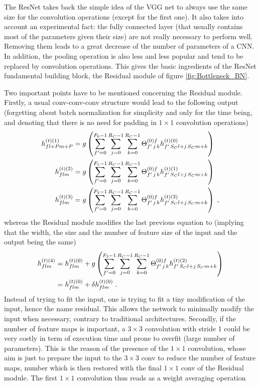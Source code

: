The ResNet\cite{He2015} takes back the simple idea of the VGG net to always use the same size for the convolution operations (except for the first one). It also takes into account an experimental fact: the fully connected layer (that usually contains most of the parameters given their size) are not really necessary to perform well. Removing them leads to a great decrease of the number of parameters of a CNN. In addition, the pooling operation is also less and less popular and tend to be replaced by convolution operations. This gives the basic ingredients of the ResNet fundamental building block, the Residual module of figure \ref{fig:Bottleneck_BN}.

\vspace{0.2cm}

Two important points have to be mentioned concerning the Residual module. Firstly, a usual conv-conv-conv structure would lead to the following output (forgetting about batch normalization for simplicity and only for the time being, and denoting that there is no need for padding in $1\times 1$ convolution operations)
\begin{align}
h^{(t)(1)}_{fl+Pm+P}&=
%
g\left(\sum^{F_0-1}_{f'=0}\sum^{R_C-1}_{j=0}\sum^{R_C-1}_{k=0}
%
\Theta^{(0)f}_{f'\,j\,k}h^{(t)(0)}_{f'\,S_Cl+j\,S_Cm+k}\right)\notag\\
%
h^{(t)(2)}_{flm}&=
%
g\left(\sum^{F_1-1}_{f'=0}\sum^{R_C-1}_{j=0}\sum^{R_C-1}_{k=0}
%
\Theta^{(0)f}_{f'\,j\,k}h^{(t)(1)}_{f'\,S_Cl+j\,S_Cm+k}\right)\notag\\
%
h^{(t)(3)}_{flm}&=
%
g\left(\sum^{F_2-1}_{f'=0}\sum^{R_C-1}_{j=0}\sum^{R_C-1}_{k=0}
%
\Theta^{(0)f}_{f'\,j\,k}h^{(t)(2)}_{f'\,S_Cl+j\,S_Cm+k}\right)\;,
\end{align}
whereas the Residual module modifies the last previous equation to (implying that the width, the size and the number of feature size of the input and the output being the same)
\begin{align}
h^{(t)(4)}_{flm}&=h^{(t)(0)}_{flm}+g\left(
%
\sum^{F_2-1}_{f'=0}\sum^{R_C-1}_{j=0}\sum^{R_C-1}_{k=0}
%
\Theta^{(0)f}_{f'\,j\,k}h^{(t)(2)}_{f'\,S_Cl+j\,S_Cm+k}\right)\notag\\
%
&=h^{(t)(0)}_{flm}+\delta h^{(t)(0)}_{flm}\;.
\end{align}
Instead of trying to fit the input, one is trying to fit a tiny modification of the input, hence the name residual. This allows the network to minimally modify the input when necessary, contrary to traditional architectures. Secondly, if the number of feature maps is important, a $3\times 3$ convolution with stride 1 could be very costly in term of execution time and prone to overfit (large number of parameters). This is the reason of the presence of the $1 \times 1$ convolution, whose aim is just to prepare the input to the $3\times 3$ conv to reduce the number of feature maps, number which is then restored with the final $1\times 1$ conv of the Residual module. The first $1\times 1$ convolution thus reads as a weight averaging operation
